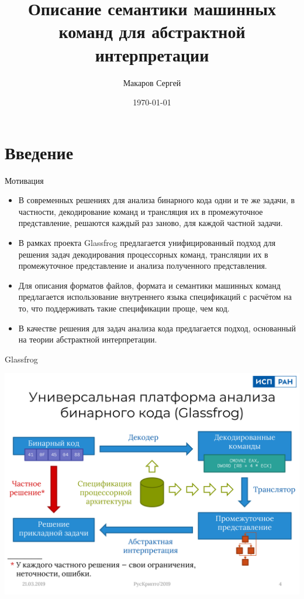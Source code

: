 \documentclass[presentation]{beamer}
\author{Макаров Сергей}
\date{\today}
\title{Описание семантики машинных команд для абстрактной интерпретации}
\begin{document}
\maketitle

\section{Введение}
\label{sec:org67bb2ac}
\begin{frame}[label={sec:orgc6e0dd7}]{Мотивация}
\begin{itemize}
\item В современных решениях для анализа бинарного кода одни и те же задачи, в частности, декодирование команд и трансляция их в промежуточное представление, решаются каждый раз заново, для каждой частной задачи.
\item В рамках проекта Glassfrog предлагается унифицированный подход для решения задач декодирования процессорных команд, трансляции их в промежуточное представление и анализа полученного представления.
\item Для описания форматов файлов, формата и семантики машинных команд предлагается использование внутреннего языка спецификаций с расчётом на то, что поддерживать такие спецификации проще, чем код.
\item В качестве решения для задач анализа кода предлагается подход, основанный на теории абстрактной интерпретации.
\end{itemize}
\end{frame}
\begin{frame}[label={sec:org779437b}]{Glassfrog}
\begin{center}
\includegraphics[width=.9\linewidth]{./glassfrog.png}
\end{center}
\end{frame}
\end{document}
